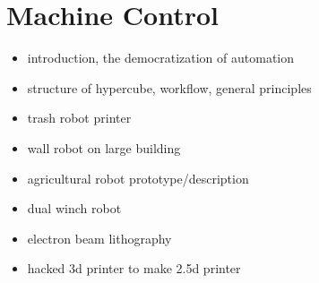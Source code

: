 \section{Machine Control}

\begin{itemize}
\tightlist
\item
introduction, the democratization of automation
\item
structure of hypercube, workflow, general principles
\item
trash robot printer
\item
wall robot on large building
\item
agricultural robot prototype/description
\item
dual winch robot
\item
electron beam lithography
\item
hacked 3d printer to make 2.5d printer
\end{itemize}